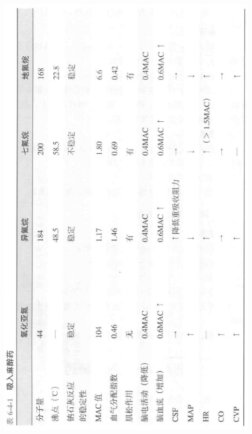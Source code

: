 \documentclass[10pt]{article}
\begin{document}
\begin{center}
\includegraphics[max width=\textwidth]{2024_07_05_645bb794a4d4f32ee0c8g-334}
\end{center}
\end{document}
